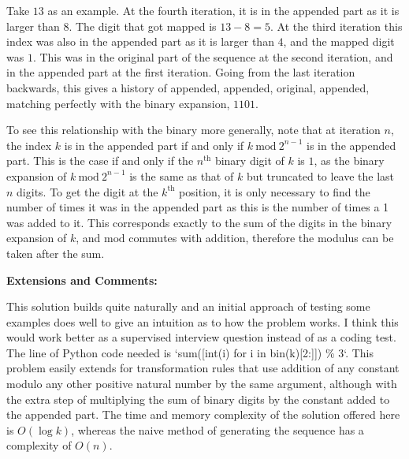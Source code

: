 Take $13$ as an example. At the fourth iteration, it is in the appended part as it is larger than $8$. The digit that got mapped is $13 - 8 = 5$. At the third iteration this index was also in the appended part as it is larger than $4$, and the mapped digit was $1$. This was in the original part of the sequence at the second iteration, and in the appended part at the first iteration. Going from the last iteration backwards, this gives a history of appended, appended, original, appended, matching perfectly with the binary expansion, $1101$.

To see this relationship with the binary more generally, note that at iteration $n$, the index $k$ is in the appended part if and only if $k \ \text{mod} \ 2^{n-1}$ is in the appended part. This is the case if and only if the $n^\text{th}$ binary digit of $k$ is $1$, as the binary expansion of $k \ \text{mod} \ 2^{n-1}$ is the same as that of $k$ but truncated to leave the last $n$ digits. To get the digit at the $k^\text{th}$ position, it is only necessary to find the number of times it was in the appended part as this is the number of times a 1 was added to it. This corresponds exactly to the sum of the digits in the binary expansion of $k$, and $\text{mod}$ commutes with addition, therefore the modulus can be taken after the sum.

\textbf{Extensions and Comments:}

This solution builds quite naturally and an initial approach of testing some examples does well to give an intuition as to how the problem works. I think this would work better as a supervised interview question instead of as a coding test. The line of Python code needed is `sum([int(i) for i in bin(k)[2:]]) \% 3`. This problem easily extends for transformation rules that use addition of any constant modulo any other positive natural number by the same argument, although with the extra step of multiplying the sum of binary digits by the constant added to the appended part. The time and memory complexity of the solution offered here is $O(\log k)$, whereas the naive method of generating the sequence has a complexity of $O(n)$.